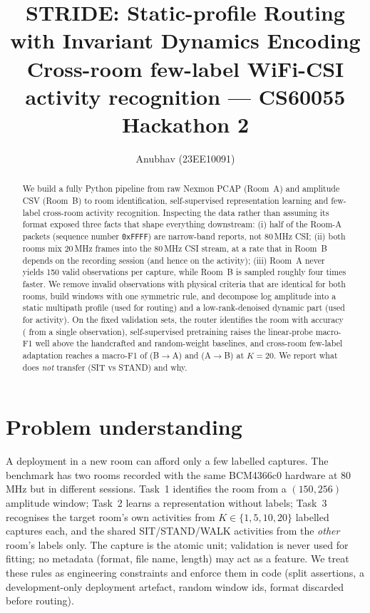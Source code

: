 \documentclass[11pt]{article}
\title{\vspace{-1.2em}\textbf{STRIDE: Static-profile Routing with Invariant Dynamics Encoding}\\[2pt]
\large Cross-room few-label WiFi-CSI activity recognition --- CS60055 Hackathon 2}
\author{Anubhav (23EE10091)}
\date{}
\begin{document}
\maketitle
\vspace{-2.5em}

\begin{abstract}\small
We build a fully Python pipeline from raw Nexmon PCAP (Room~A) and amplitude CSV (Room~B) to
room identification, self-supervised representation learning and few-label cross-room activity
recognition. Inspecting the data rather than assuming its format exposed three facts that shape everything
downstream: (i) half of the Room-A packets (sequence number \texttt{0xFFFF}) are narrow-band reports, not 80\,MHz CSI; (ii) both rooms mix
20\,MHz frames into the 80\,MHz CSI stream, at a rate that in Room~B depends on the recording session
(and hence on the activity); (iii) Room~A never yields 150 valid observations per capture, while
Room~B is sampled roughly four times faster. We remove invalid observations with physical criteria that are identical for
both rooms, build windows with one symmetric rule, and decompose log amplitude into a static multipath
profile (used for routing) and a low-rank-denoised dynamic part (used for activity). On the fixed validation
sets, the router identifies the room with accuracy \tOneLonefifty{} (\tOneLone{} from a single observation),
self-supervised pretraining raises the linear-probe macro-F1 well above the handcrafted and random-weight
baselines, and cross-room few-label adaptation reaches a macro-F1 of \headAKtwenty{} (B$\to$A) and
\headBKtwenty{} (A$\to$B) at $K{=}20$. We report what does \emph{not} transfer (SIT vs STAND) and why.
\end{abstract}

\section{Problem understanding}
A deployment in a new room can afford only a few labelled captures. The benchmark has two rooms
recorded with the same BCM4366c0 hardware at 80\,MHz but in different sessions. Task~1 identifies the
room from a $(150,256)$ amplitude window; Task~2 learns a representation without labels; Task~3
recognises the target room's own activities from $K\in\{1,5,10,20\}$ labelled captures each, and the
shared SIT/STAND/WALK activities from the \emph{other} room's labels only. The capture is the atomic unit;
validation is never used for fitting; no metadata (format, file name, length) may act as a feature.
We treat these rules as engineering constraints and enforce them in code (split assertions, a
development-only deployment artefact, random window ids, format discarded before routing).
\end{document}
